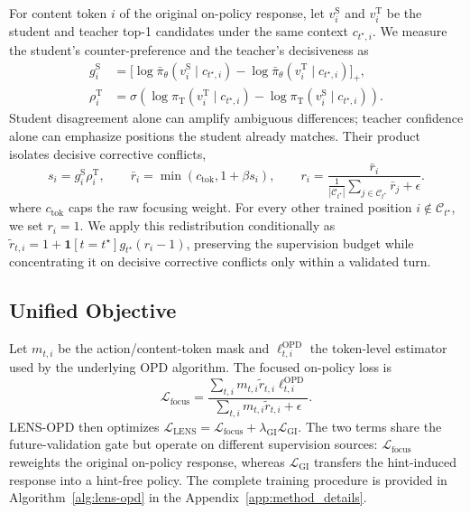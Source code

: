 \documentclass{article}
\begin{document}
For content token $i$ of the original on-policy response, let $v_i^{\mathrm S}$ and
$v_i^{\mathrm T}$ be the student and teacher top-1 candidates under the same context
$c_{t^\star,i}$.  We measure the student's counter-preference and the teacher's decisiveness as
\begin{equation}
\begin{aligned}
    g_i^{\mathrm S}
    &=\Big[
      \log\bar\pi_\theta(v_i^{\mathrm S}\mid c_{t^\star,i})
      -\log\bar\pi_\theta(v_i^{\mathrm T}\mid c_{t^\star,i})
      \Big]_+,\\
    \rho_i^{\mathrm T}
    &=\sigma\!\left(
      \log\pi_{\mathrm T}(v_i^{\mathrm T}\mid c_{t^\star,i})
      -\log\pi_{\mathrm T}(v_i^{\mathrm S}\mid c_{t^\star,i})
      \right).
\end{aligned}
\label{eq:confident-disagreement-components}
\end{equation}
Student disagreement alone can amplify ambiguous differences; teacher confidence alone can
emphasize positions the student already matches.  Their product isolates decisive corrective
conflicts,
\begin{equation}
    s_i=g_i^{\mathrm S}\rho_i^{\mathrm T},
    \qquad
    \bar r_i=\min\!\left(c_{\mathrm{tok}},1+\beta s_i\right),
    \qquad
    r_i=\frac{\bar r_i}
    {\frac{1}{|\mathcal C_{t^\star}|}
     \sum_{j\in\mathcal C_{t^\star}}\bar r_j+\epsilon}.
    \label{eq:confident-disagreement-token-weight}
\end{equation}
where $c_{\mathrm{tok}}$ caps the raw focusing weight.  For every other trained position
$i\notin\mathcal C_{t^\star}$, we set $r_i=1$.  We apply this redistribution conditionally as
$\widetilde r_{t,i}=1+\mathbf 1[t=t^\star]g_{t^\star}(r_i-1)$, preserving the supervision budget
while concentrating it on decisive corrective conflicts only within a validated turn.

\subsection{Unified Objective}

Let $m_{t,i}$ be the action/content-token mask and
$\ell_{t,i}^{\mathrm{OPD}}$ the token-level estimator used by the underlying OPD algorithm.  The
focused on-policy loss is
\begin{equation}
    \mathcal L_{\mathrm{focus}}
    =\frac{
      \sum_{t,i}m_{t,i}\widetilde r_{t,i}\ell_{t,i}^{\mathrm{OPD}}
    }{
      \sum_{t,i}m_{t,i}\widetilde r_{t,i}+\epsilon
    }.
    \label{eq:focused-opd}
\end{equation}
LENS-OPD then optimizes
$\mathcal L_{\mathrm{LENS}}=\mathcal L_{\mathrm{focus}}+
\lambda_{\mathrm{GI}}\mathcal L_{\mathrm{GI}}$.
The two terms share the future-validation gate but operate on different supervision sources:
$\mathcal L_{\mathrm{focus}}$ reweights the original on-policy response, whereas
$\mathcal L_{\mathrm{GI}}$ transfers the hint-induced response into a hint-free policy.  The complete
training procedure is provided in Algorithm~\ref{alg:lens-opd} in the Appendix~\ref{app:method_details}.
\end{document}

